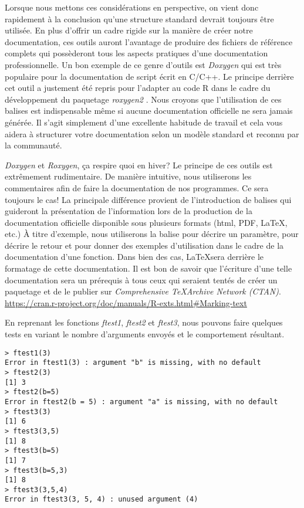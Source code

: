 \noindent
Lorsque nous mettons ces considérations en perspective, on vient donc rapidement à la conclusion qu'une structure standard devrait toujours être utilisée. En plus d'offrir un cadre rigide sur la manière de créer notre documentation, ces outils auront l'avantage de produire des fichiers de référence complets qui possèderont tous les aspects pratiques d'une documentation professionnelle. Un bon exemple de ce genre d'outils est \emph{Doxygen} \cite{doxygen} qui est très populaire pour la documentation de script écrit en C/C++. Le principe derrière cet outil a justement été repris pour l'adapter au code R dans le cadre du développement du paquetage \emph{roxygen2} \cite{roxygen2}. Nous croyons que l'utilisation de ces balises est indispensable même si aucune documentation officielle ne sera jamais générée. Il s'agit simplement d'une excellente habitude de travail et cela vous aidera à structurer votre documentation selon un modèle standard et reconnu par la communauté.\\

\begin{moreInfo}{\emph{Doxygen} et \emph{Roxygen}, ça respire quoi en hiver?}
	Le principe de ces outils est extrêmement rudimentaire. De manière intuitive, nous utiliserons les commentaires afin de faire la documentation de nos programmes. Ce sera toujours le cas! La principale différence provient de l'introduction de balises qui guideront la présentation de l'information lors de la production de la documentation officielle disponible sous plusieurs formats (html, PDF, \LaTeX, etc.) À titre d'exemple, nous utiliserons la balise \@param pour décrire un paramètre, \@return pour décrire le retour et \@examples pour donner des exemples d'utilisation dans le cadre de la documentation d'une fonction. Dans bien des cas, \LaTeX  sera derrière le formatage de cette documentation. Il est bon de savoir que l'écriture d'une telle documentation sera un prérequis à tous ceux qui seraient tentés de créer un paquetage et de le publier sur \emph{Comprehensive \TeX Archive Network (CTAN)}. \\
	\url{https://cran.r-project.org/doc/manuals/R-exts.html#Marking-text}
\end{moreInfo}

\noindent
En reprenant les fonctions \emph{ftest1}, \emph{ftest2} et \emph{ftest3}, nous pouvons faire quelques tests en variant le nombre d'arguments envoyés et le comportement résultant.

\begin{lstlisting}[caption = Passage d'arguments à une fonction,label=src:callFctParam]
> ftest1(3)
Error in ftest1(3) : argument "b" is missing, with no default
> ftest2(3)
[1] 3
> ftest2(b=5)
Error in ftest2(b = 5) : argument "a" is missing, with no default
> ftest3(3)
[1] 6
> ftest3(3,5)
[1] 8
> ftest3(b=5)
[1] 7
> ftest3(b=5,3)
[1] 8
> ftest3(3,5,4)
Error in ftest3(3, 5, 4) : unused argument (4)
\end{lstlisting}

